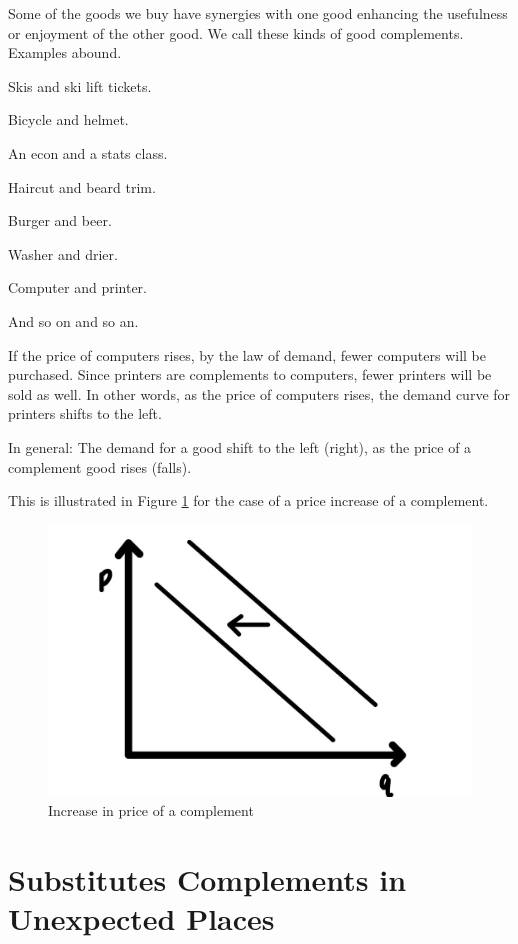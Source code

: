 \documentclass[
]{book}
\begin{document}
Some of the goods we buy have synergies with one good enhancing the usefulness or enjoyment of the other good. We call these kinds of good complements. Examples abound.

\begin{center}
Skis and ski lift tickets.

Bicycle and helmet.

An econ and a stats class.

Haircut and beard trim.

Burger and beer.

Washer and drier.

Computer and printer.

And so on and so an.

\end{center}

If the price of computers rises, by the law of demand, fewer computers will be purchased. Since printers are complements to computers, fewer printers will be sold as well. In other words, as the price of computers rises, the demand curve for printers shifts to the left.

In general: The demand for a good shift to the left (right), as the price of a complement good rises (falls).

This is illustrated in Figure \ref{fig:demand08} for the case of a price increase of a complement.

\begin{figure}

{\centering \includegraphics[width=0.75\linewidth]{img/demand/fig8} 

}

\caption{Increase in price of a complement}\label{fig:demand08}
\end{figure}

\hypertarget{substitutes-complements-in-unexpected-places}{%
\section{Substitutes Complements in Unexpected Places}\label{substitutes-complements-in-unexpected-places}}
\end{document}
